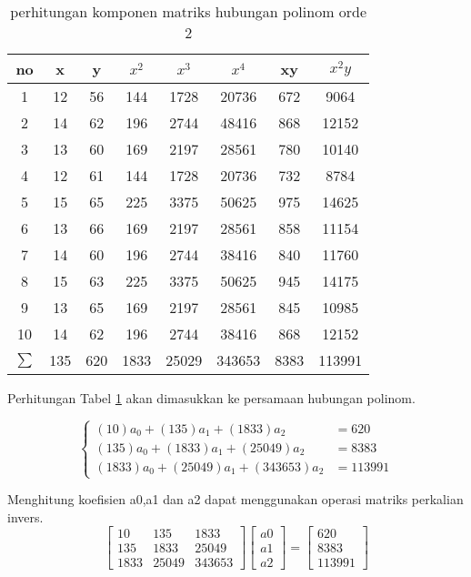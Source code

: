 \begin{table}[H]
\caption{perhitungan komponen matriks hubungan polinom orde 2}
\centering 
\begin{tabular}{|c|c|c|c|c|c|c|c|}
\hline 
no & x & y & $x^2$ & $x^3$ & $x^4$ & xy & $x^2 y$ \\ 
\hline 
1 & 12 & 56 & 144 & 1728 & 20736 & 672 & 9064 \\ 
\hline 
2 & 14 & 62 & 196 & 2744 & 48416 & 868 & 12152 \\ 
\hline 
3 & 13 & 60 & 169 & 2197 & 28561 & 780 & 10140 \\ 
\hline 
4 & 12 & 61 & 144 & 1728 & 20736 & 732 & 8784 \\ 
\hline 
5 & 15 & 65 & 225 & 3375 & 50625 & 975 & 14625 \\ 
\hline 
6 & 13 & 66 & 169 & 2197 & 28561 & 858 & 11154 \\ 
\hline 
7 & 14 & 60 & 196 & 2744 & 38416 & 840 & 11760 \\ 
\hline 
8 & 15 & 63 & 225 & 3375 & 50625 & 945 & 14175 \\ 
\hline 
9 & 13 & 65 & 169 & 2197 & 28561 & 845 & 10985 \\ 
\hline 
10 & 14 & 62 & 196 & 2744 & 38416 & 868 & 12152 \\ 
\hline 
$\sum  $ & 135 & 620 & 1833 & 25029 & 343653 & 8383 & 113991 \\ 
\hline 
\end{tabular} 
\label{tab:tabelhubunganpolinomcontoh}
\end{table}

Perhitungan Tabel \ref{tab:tabelhubunganpolinomcontoh} akan dimasukkan ke persamaan hubungan polinom.

\begin{displaymath}
		\begin{cases}
		   	(10)a_0 + (135) a_1 + (1833)a_2 &= 620 \\
		   		(135) a_0 + (1833)a_1 + (25049)a_2 &= 8383 \\
		   		(1833)a_0 + (25049)a_1 + (343653)a_2 &= 113991	   
		\end{cases}  
\end{displaymath} 

Menghitung koefisien a0,a1 dan a2 dapat menggunakan operasi matriks perkalian invers.
\begin{displaymath}
			\begin{bmatrix}
			10 & 135 & 1833 \\
			135  & 1833 & 25049 \\
			1833 & 25049 & 343653 
			\end{bmatrix}
			\begin{bmatrix}
			a0 \\ 
			a1 \\ 
			a2
			\end{bmatrix}
			=
			\begin{bmatrix}
				 620\\
				8383 \\
				 113991
			\end{bmatrix}
\end{displaymath}

